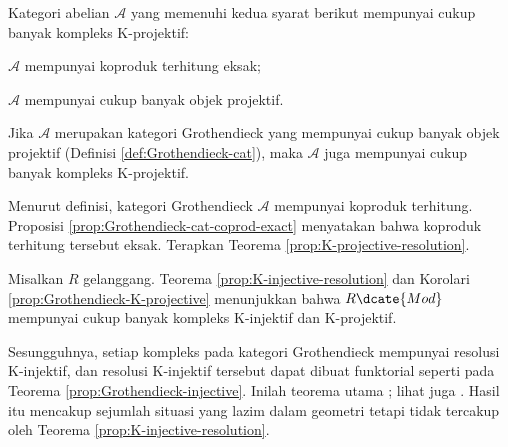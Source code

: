 \begin{teorema}\label{prop:K-projective-resolution}
	Kategori abelian $\mathcal{A}$ yang memenuhi kedua syarat berikut mempunyai
	cukup banyak kompleks K-projektif:
	\begin{compactitem}
		\item $\mathcal{A}$ mempunyai koproduk terhitung eksak;
		\item $\mathcal{A}$ mempunyai cukup banyak objek projektif.
	\end{compactitem}
\end{teorema}

\begin{korolari}\label{prop:Grothendieck-K-projective}
	Jika $\mathcal{A}$ merupakan kategori Grothendieck yang mempunyai cukup
	banyak objek projektif (Definisi \ref{def:Grothendieck-cat}), maka
	$\mathcal{A}$ juga mempunyai cukup banyak kompleks K-projektif.
\end{korolari}

\begin{bukti}
	Menurut definisi, kategori Grothendieck $\mathcal{A}$ mempunyai koproduk
	terhitung. Proposisi \ref{prop:Grothendieck-cat-coprod-exact} menyatakan
	bahwa koproduk terhitung tersebut eksak. Terapkan Teorema
	\ref{prop:K-projective-resolution}.
\end{bukti}

\begin{contoh}\label{eg:Mod-K-injectives}
	Misalkan $R$ gelanggang. Teorema \ref{prop:K-injective-resolution} dan
	Korolari \ref{prop:Grothendieck-K-projective} menunjukkan bahwa
	$R\dcate{Mod}$ mempunyai cukup banyak kompleks K-injektif dan
	K-projektif.
\end{contoh}

Sesungguhnya, setiap kompleks pada kategori Grothendieck mempunyai resolusi
K-injektif, dan resolusi K-injektif tersebut dapat dibuat funktorial seperti
pada Teorema \ref{prop:Grothendieck-injective}. Inilah teorema utama
\cite{Serp03}; lihat juga \cite[Tag 079P]{stacks}. Hasil itu mencakup
sejumlah situasi yang lazim dalam geometri tetapi tidak tercakup oleh Teorema
\ref{prop:K-injective-resolution}.
